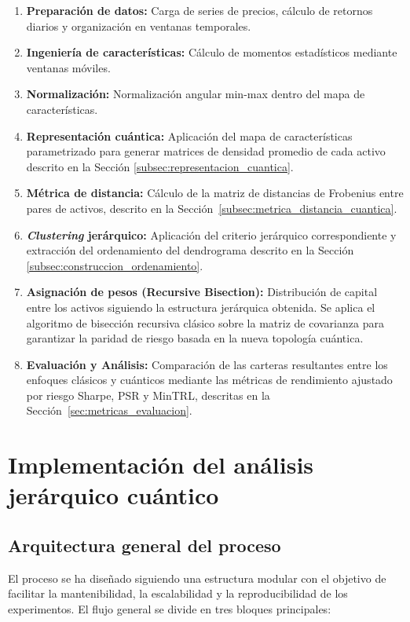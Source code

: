 \begin{enumerate}
    \item \textbf{Preparación de datos:} Carga de series de precios, cálculo de retornos diarios y organización en ventanas temporales.
    \item \textbf{Ingeniería de características:} Cálculo de momentos estadísticos mediante ventanas móviles.
    \item \textbf{Normalización:} Normalización angular min-max dentro del mapa de características.
    \item \textbf{Representación cuántica:} Aplicación del mapa de características parametrizado para generar matrices de densidad promedio de cada activo descrito en la Sección \ref{subsec:representacion_cuantica}.
    \item \textbf{Métrica de distancia:} Cálculo de la matriz de distancias de Frobenius entre pares de activos, descrito en la Sección~\ref{subsec:metrica_distancia_cuantica}.
    \item \textbf{\textit{Clustering} jerárquico:} Aplicación del criterio jerárquico correspondiente y extracción del ordenamiento del dendrograma descrito en la Sección \ref{subsec:construccion_ordenamiento}.
    \item \textbf{Asignación de pesos (Recursive Bisection):} Distribución de capital entre los activos siguiendo la estructura jerárquica obtenida. Se aplica el algoritmo de bisección recursiva clásico sobre la matriz de covarianza para garantizar la paridad de riesgo basada en la nueva topología cuántica.
    \item \textbf{Evaluación y Análisis:} Comparación de las carteras resultantes entre los enfoques clásicos y cuánticos mediante las métricas de rendimiento ajustado por riesgo Sharpe, \gls{PSR} y \gls{MinTRL}, descritas en la Sección~\ref{sec:metricas_evaluacion}.
\end{enumerate}


\section{Implementación del análisis jerárquico cuántico}
\label{sec:implementacion_analisis}

\subsection{Arquitectura general del proceso}
\label{sec:arquitectura_proceso}

El proceso se ha diseñado siguiendo una estructura modular con el objetivo de facilitar la mantenibilidad, la escalabilidad y la reproducibilidad de los experimentos. El flujo general se divide en tres bloques principales:

